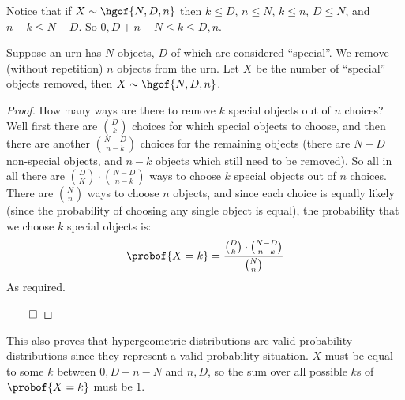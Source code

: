 \begin{note}

	Notice that if $X\sim\hgof{N,D,n}$ then $k\leq D$, $n\leq N$, $k\leq n$, $D\leq N$, and $n-k\leq N-D$.
	So $0,D+n-N\leq k\leq D, n$.

\end{note}

\begin{thrm*}

	Suppose an urn has $N$ objects, $D$ of which are considered ``special''.
	We remove (without repetition) $n$ objects from the urn.
	Let $X$ be the number of ``special'' objects removed, then $X\sim\hgof{N,D,n}$.

\end{thrm*}

\begin{proof}

	How many ways are there to remove $k$ special objects out of $n$ choices?
	Well first there are $\binom Dk$ choices for which special objects to choose, and then there are another $\binom{N-D}{n-k}$
	choices for the remaining objects (there are $N-D$ non-special objects, and $n-k$ objects which still need to be removed).
	So all in all there are $\binom DK\cdot\binom{N-D}{n-k}$ ways to choose $k$ special objects out of $n$ choices.
	There are $\binom Nn$ ways to choose $n$ objects, and since each choice is equally likely (since the probability of choosing any single
	object is equal), the probability that we choose $k$ special objects is:
	\[ \probof{X=k} = \dfrac{\binom Dk\cdot\binom{N-D}{n-k}}{\binom Nn} \]
	As required.

	\hfill$\qed$

\end{proof}

\begin{note}

	This also proves that hypergeometric distributions are valid probability distributions since they represent a valid probability situation.
	$X$ must be equal to some $k$ between $0,D+n-N$ and $n,D$, so the sum over all possible $k$s of $\probof{X=k}$ must be $1$.

\end{note}

